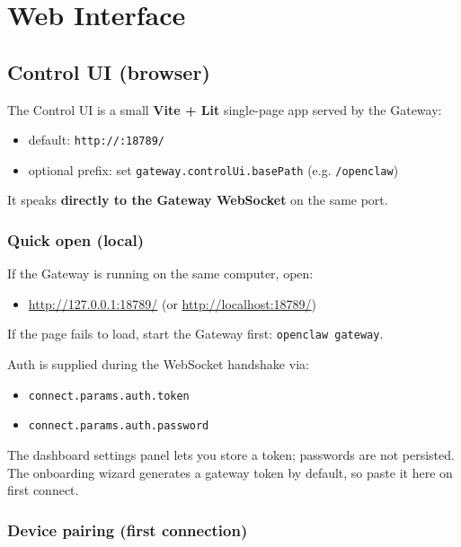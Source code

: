 \chapter{Web Interface}

\section{Control UI (browser)}


The Control UI is a small \textbf{Vite + Lit} single-page app served by the Gateway:

\begin{itemize}
  \item default: \texttt{http://:18789/}
  \item optional prefix: set \texttt{gateway.controlUi.basePath} (e.g. \texttt{/openclaw})
\end{itemize}


It speaks \textbf{directly to the Gateway WebSocket} on the same port.

\subsection{Quick open (local)}


If the Gateway is running on the same computer, open:

\begin{itemize}
  \item \href{http://127.0.0.1:18789/}{http://127.0.0.1:18789/} (or \href{http://localhost:18789/}{http://localhost:18789/})
\end{itemize}


If the page fails to load, start the Gateway first: \texttt{openclaw gateway}.

Auth is supplied during the WebSocket handshake via:

\begin{itemize}
  \item \texttt{connect.params.auth.token}
  \item \texttt{connect.params.auth.password}
\end{itemize}

The dashboard settings panel lets you store a token; passwords are not persisted.
The onboarding wizard generates a gateway token by default, so paste it here on first connect.

\subsection{Device pairing (first connection)}


